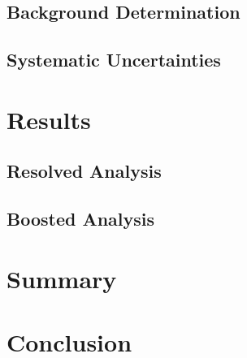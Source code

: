 \subsection{Background Determination}
\subsection{Systematic Uncertainties}
\section{Results}
\subsection{Resolved Analysis}
\subsection{Boosted Analysis}
\section{Summary}
\section{Conclusion}


